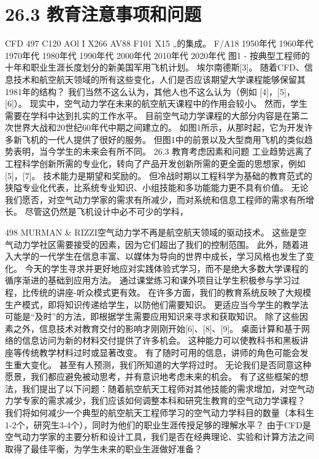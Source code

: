 \documentclass[UTF8,11pt,a4paper,openany,fontset=fandol]{ctexbook}
\begin{document}
\section{26.3 教育注意事项和问题}
CFD 497 C120 AOl I X266 AV88 F101 X15 „的集成。 F/A18 1950年代 1960年代 1970年代 1980年代 1990年代 2000年代 2010年代 2020年代 图1 - 按典型工程师的十年和职业生涯长度划分的新美国军用飞机计划。 埃尔南德斯[3]。 随着CFD、信息技术和航空航天领域的所有这些变化，人们是否应该期望大学课程能够保留其1981年的结构？ 我们当然不这么认为，其他人也不这么认为（例如 [4]，[5]，[6]）。 现实中，空气动力学在未来的航空航天课程中的作用会较小。 然而，学生需要在学科中达到扎实的工作水平。 目前空气动力学课程的大部分内容是在第二次世界大战和20世纪60年代中期之间建立的。 如图1所示，从那时起，它为开发许多新飞机的一代人提供了很好的服务。 但图1中的前景以及大型商用飞机的类似趋势表明，当今学生的未来会有所不同。 26.3 教育考虑因素和问题 工业趋势远离了工程科学创新所需的专业化，转向了产品开发创新所需的更全面的思想家，例如[5]，[7]。 技术能力是期望和奖励的。 但冷战时期以工程科学为基础的教育范式的狭隘专业化代表，比系统专业知识、小组技能和多功能能力更不具有价值。 无论我们愿否，对空气动力学家的需求有所减少，而对系统和信息工程师的需求有所增长。 尽管这仍然是飞机设计中必不可少的学科，

498 MURMAN \& RIZZI空气动力学不再是航空航天领域的驱动技术。 这些是空气动力学社区需要接受的因素，因为它们超出了我们的控制范围。 此外，随着进入大学的一代学生在信息丰富、以媒体为导向的世界中成长，学习风格也发生了变化。 今天的学生寻求并更好地应对实践体验式学习，而不是绝大多数大学课程的循序渐进的基础到应用方法。 通过课堂练习和课外项目让学生积极参与学习过程，比传统的讲座-听众模式更有效。 在许多方面，我们的教育系统反映了大规模生产模式，即将知识传递给学生，以防他们需要知识。 更适应当今学生的教学法可能是“及时”的方法，即根据学生需要应用知识来寻求和获取知识。 除了这些因素之外，信息技术对教育交付的影响才刚刚开始[6]、[8]、[9]。 桌面计算和基于网络的信息访问为新的材料交付提供了许多机会。 这种能力可以使教科书和黑板讲座等传统教学材料过时或显著改变。 有了随时可用的信息，讲师的角色可能会发生重大变化。 甚至有人预测，我们所知道的大学将过时。 无论我们是否同意这种愿景，我们都应避免被动思考，并有意识地考虑未来的机会。 有了这些框架的想法，我们提出了以下问题：随着航空航天工程师对其他技能的需求增加，对空气动力学专家的需求减少，我们应该如何调整本科和研究生教育的空气动力学课程？ 我们将如何减少一个典型的航空航天工程师学习的空气动力学科目的数量（本科生1-2个，研究生3-4个），同时为他们的职业生涯传授足够的理解水平？ 由于CFD是空气动力学家的主要分析和设计工具，我们是否在经典理论、实验和计算方法之间取得了最佳平衡，为学生未来的职业生涯做好准备？
\end{document}
